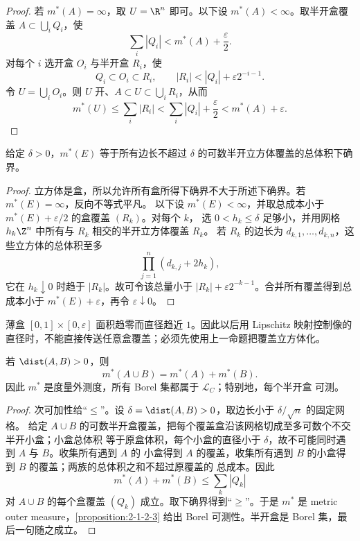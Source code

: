 \begin{proof}
若 $m^*(A)=\infty$，取 $U=\R^n$ 即可。以下设 $m^*(A)<\infty$。取半开盒覆盖
$A\subset\bigcup_iQ_i$，使
\[
 \sum_i|Q_i|<m^*(A)+\frac{\varepsilon}{2}.
\]
对每个 $i$ 选开盒 $O_i$ 与半开盒 $R_i$，使
\[
 Q_i\subset O_i\subset R_i,
 \qquad |R_i|<|Q_i|+\varepsilon2^{-i-1}.
\]
令 $U=\bigcup_iO_i$。则 $U$ 开、$A\subset U\subset\bigcup_iR_i$，从而
\[
 m^*(U)\le\sum_i|R_i|
 <\sum_i|Q_i|+\frac{\varepsilon}{2}
 <m^*(A)+\varepsilon.
\]
\end{proof}

\begin{proposition}[外测度可由任意细立方体计算]\label{proposition:2-1-3-1a}
给定 $\delta>0$，$m^*(E)$ 等于所有边长不超过 $\delta$ 的可数半开立方体覆盖的总体积下确界。
\end{proposition}

\begin{proof}
立方体是盒，所以允许所有盒所得下确界不大于所述下确界。若 $m^*(E)=\infty$，反向不等式平凡。
以下设 $m^*(E)<\infty$，并取总成本小于 $m^*(E)+\varepsilon/2$ 的盒覆盖 $(R_k)$。对每个 $k$，
选 $0<h_k\le\delta$ 足够小，并用网格 $h_k\Z^n$ 中所有与 $R_k$ 相交的半开立方体覆盖 $R_k$。
若 $R_k$ 的边长为 $d_{k,1},\ldots,d_{k,n}$，这些立方体的总体积至多
\[
 \prod_{j=1}^n(d_{k,j}+2h_k),
\]
它在 $h_k\downarrow0$ 时趋于 $|R_k|$。故可令该总量小于
$|R_k|+\varepsilon2^{-k-1}$。合并所有覆盖得到总成本小于 $m^*(E)+\varepsilon$，再令
$\varepsilon\downarrow0$。
\end{proof}

\begin{remark}
薄盒 $[0,1]\times[0,\varepsilon]$ 面积趋零而直径趋近 $1$。因此以后用 Lipschitz 映射控制像的
直径时，不能直接传送任意盒覆盖；必须先使用上一命题把覆盖立方体化。
\end{remark}

\begin{lemma}\label{lem:lebesgue-metric-outer}
若 $\dist(A,B)>0$，则
\[
 m^*(A\cup B)=m^*(A)+m^*(B).
\]
因此 $m^*$ 是度量外测度，所有 Borel 集都属于 $\mathcal L_C$；特别地，每个半开盒
\Caratheodory{} 可测。
\end{lemma}

\begin{proof}
次可加性给“$\le$”。设 $\delta=\dist(A,B)>0$，取边长小于 $\delta/\sqrt n$ 的固定网格。
给定 $A\cup B$ 的可数半开盒覆盖，把每个覆盖盒沿该网格切成至多可数个不交半开小盒；小盒总体积
等于原盒体积，每个小盒的直径小于 $\delta$，故不可能同时遇到 $A$ 与 $B$。收集所有遇到 $A$ 的
小盒得到 $A$ 的覆盖，收集所有遇到 $B$ 的小盒得到 $B$ 的覆盖；两族的总体积之和不超过原覆盖的
总成本。因此
\[
 m^*(A)+m^*(B)\le\sum_k|Q_k|
\]
对 $A\cup B$ 的每个盒覆盖 $(Q_k)$ 成立。取下确界得到“$\ge$”。于是 $m^*$ 是 metric outer
measure，\cref{proposition:2-1-2-3} 给出 Borel 可测性。半开盒是 Borel 集，最后一句随之成立。
\end{proof}

